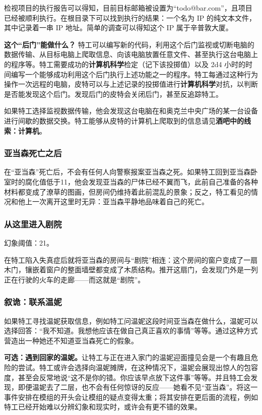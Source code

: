 检视项目的执行报告可以得知，目前目标邮箱被设置为“todo@bar.com”，且项目已经被顺利执行。在根目录下可以找到执行的结果：一个名为 IP 的纯文本文件，其中记录着一串 IP 地址。简单的调查可以得知这个 IP 属于辛普敦大厦。

\textbf{这个“后门”能做什么？} 特工可以编写新的代码，利用这个后门监视或切断电脑的数据传输、从目标电脑上爬取信息、向该电脑放置任意文件、甚至执行这台电脑上的程序等。特工需要成功的\textbf{计算机科学}检定（记下该投掷值）以及 2d4 小时的时间编写一个能够成功利用这个后门执行上述功能之一的程序。特工每通过这种行为操作一次远程的电脑，皮特可以与上述记录的投掷值进行\textbf{计算机科学}对抗，以判断是否能发现这个后门。发现后门的皮特会关闭后门，甚至反追踪特工。

如果特工选择监视数据传输，他会发现这台电脑在和奥克兰中央广场的某一台设备进行间歇的数据交换。特工能够从皮特的计算机上爬取到的信息请见\textbf{酒吧中的线索：计算机}。

\subsubsection{亚当森死亡之后}
在“亚当森”死亡后，不会有任何人向警察报案亚当森之死。如果特工回到亚当森卧室时的腐化值低于11，他会发现亚当森的尸体已经不翼而飞，此前自己准备的各种材料都变成了潦草的图画，但房间仍维持着此前混乱的景象；反之，特工看见的情况和他上一次离开这里时无异：亚当森平静地品味着自己的死亡。

\subsubsection{从这里进入剧院}
幻象阈值：21。

在特工陷入失真症后就将亚当森的房间与“剧院”相连：这个房间的窗户变成了一扇木门，镶嵌着窗户的整面墙壁都变成了木质结构。推开这扇门，会发现门外是一列正在行驶的火车的走廊——而这就是“剧院”。

\subsubsection{叙诡：联系温妮}
如果特工寻找温妮获取信息，例如特工问温妮这段时间亚当森在做什么，温妮可以选择回答：“我不知道。我想他应该在做自己真正喜欢的事情”等等。通过这种方式营造出一种她还不知道亚当森死亡的假象。

\textbf{可选：遇到回家的温妮。}让特工与正在进入家门的温妮迎面撞见会是一个有趣且危险的尝试。特工或许会选择向温妮摊牌，在这种情况下，温妮会展现出惊人的包容度，甚至会反常地说“这不是你的错。你应该早点放下这件事”等等。并且特工会发现，即便温妮去了二层，也不会有任何惊讶的反应——她看不见“亚当森”。将这一事件安排在模组的开头会让模组的疑点变得太重；将其安排在更后面的流程，例如特工已经开始难以分辨幻象和现实时，或许会有更不错的效果。